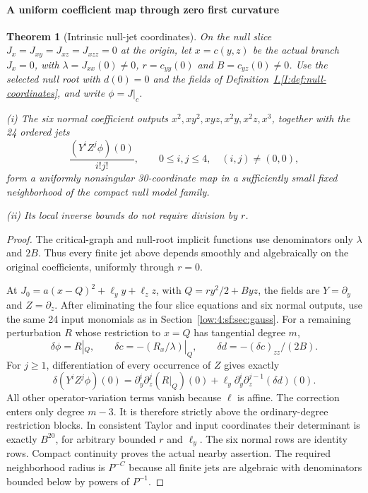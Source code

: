\documentclass[11pt]{amsart}
\newtheorem{theorem}{Theorem}[section]
\theoremstyle{definition}
\theoremstyle{remark}
\numberwithin{equation}{section}
\newcommand{\partIref}[1]{\hyperref[I:#1]{I.\ref*{I:#1}}}
\begin{document}
\paragraph{A uniform coefficient map through zero first curvature}
\begin{theorem}[Intrinsic null-jet coordinates]\label{low:4:sf:thm:nulljets}
On the null slice $J_x=J_{xy}=J_{xz}=J_{xzz}=0$ at the origin, let $x=c(y,z)$ be the actual branch $J_x=0$, with $\lambda=J_{xx}(0)\ne0$, $r=c_{yy}(0)$ and $B=c_{yz}(0)\ne0$. Use the selected null root with $d(0)=0$ and the fields of Definition~\partIref{def:null-coordinates}, and write $\phi=J|_c$.

\noindent\textup{(i)} The six normal coefficient outputs $x^2,xy^2,xyz,x^2y,x^2z,x^3$, together with the 24 ordered jets
\[
\frac{(Y^iZ^j\phi)(0)}{i!j!},\qquad 0\le i,j\le4,\quad (i,j)\ne(0,0),
\]
form a uniformly nonsingular 30-coordinate map in a sufficiently small fixed neighborhood of the compact null model family.

\noindent\textup{(ii)} Its local inverse bounds do not require division by $r$.
\end{theorem}
\begin{proof}
The critical-graph and null-root implicit functions use denominators only $\lambda$ and $2B$. Thus every finite jet above depends smoothly and algebraically on the original coefficients, uniformly through $r=0$.

At $J_0=a(x-Q)^2+\ell_y y+\ell_z z$, with $Q=r y^2/2+B yz$, the fields are $Y=\partial_y$ and $Z=\partial_z$. After eliminating the four slice equations and six normal outputs, use the same 24 input monomials as in Section~\ref{low:4:sf:sec:gauss}. For a remaining perturbation $R$ whose restriction to $x=Q$ has tangential degree $m$,
\[
\delta\phi=R|_Q,\qquad
\delta c=-(R_x/\lambda)|_Q,\qquad
\delta d=-(\delta c)_{zz}/(2B).
\]
For $j\ge1$, differentiation of every occurrence of $Z$ gives exactly
\[
\delta(Y^iZ^j\phi)(0)=
\partial_y^i\partial_z^j(R|_Q)(0)
+\ell_y\partial_y^i\partial_z^{j-1}(\delta d)(0).
\]
All other operator-variation terms vanish because $\ell$ is affine. The correction enters only degree $m-3$. It is therefore strictly above the ordinary-degree restriction blocks. In consistent Taylor and input coordinates their determinant is exactly $B^{20}$, for arbitrary bounded $r$ and $\ell_y$. The six normal rows are identity rows. Compact continuity proves the actual nearby assertion. The required neighborhood radius is $P^{-C}$ because all finite jets are algebraic with denominators bounded below by powers of $P^{-1}$.
\end{proof}
\end{document}
